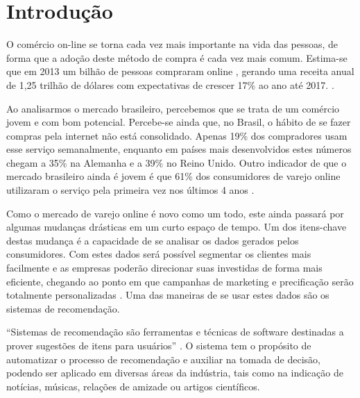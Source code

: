 \chapter[Introdução]{Introdução}
\label{chap:introducao}

O comércio on-line se torna cada vez mais importante na vida das pessoas, de forma que a adoção deste método de compra é cada vez mais comum. Estima-se que em 2013 um bilhão de pessoas compraram online \cite{emarketerB2CEcommerceClimbs}, gerando uma receita anual de 1,25 trilhão de dólares com expectativas de crescer 17\% ao ano até 2017. \cite{emarketerGlobalB2CSales}. 

Ao analisarmos o mercado brasileiro, percebemos que se trata de um comércio jovem e com bom potencial. Percebe-se ainda que, no Brasil, o hábito de se fazer compras pela internet não está consolidado. Apenas 19\% dos compradores usam esse serviço semanalmente, enquanto em países mais desenvolvidos estes números chegam a 35\% na Alemanha e a 39\% no Reino Unido. Outro indicador de que o mercado brasileiro ainda é jovem é que 61\% dos consumidores de varejo online utilizaram o serviço pela primeira vez nos últimos 4 anos \cite{PWCTotalRetail}.

Como o mercado de varejo online é novo como um todo, este ainda passará por algumas mudanças drásticas em um curto espaço de tempo. Um dos itens-chave destas mudança é a capacidade de se analisar os dados gerados pelos consumidores. Com estes dados será possível segmentar os clientes mais facilmente e as empresas poderão direcionar suas investidas de forma mais eficiente, chegando ao ponto em que campanhas de marketing e precificação serão totalmente personalizadas \cite{BCGThegotomarketrevolution}. Uma das maneiras de se usar estes dados são os sistemas de recomendação.

``Sistemas de recomendação são ferramentas e técnicas de software destinadas a prover sugestões de itens para usuários'' \cite{ricci2011introduction-chap1}. O sistema tem o propósito de automatizar o processo de recomendação e auxiliar na tomada de decisão, podendo ser aplicado em diversas áreas da indústria, tais como na indicação de notícias, músicas, relações de amizade ou artigos científicos.

